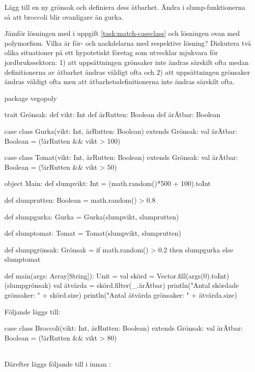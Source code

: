 \Subtask Lägg till en ny grönsak  och definiera dess ätbarhet. Ändra i slump-funktionerna så att broccoli blir ovanligare än gurka.

\Subtask Jämför lösningen med  i uppgift \ref{task:match-caseclass} och lösningen ovan med polymorfism. Vilka är för- och nackdelarna med respektive lösning? Diskutera två olika situationer på ett hypotetiskt företag som utvecklar mjukvara för jordbrukssektorn: 1) att uppsättningen grönsaker inte ändras särskilt ofta medan definitionerna av ätbarhet ändras väldigt ofta och 2) att uppsättningen grönsaker ändras väldigt ofta men att ätbarhetsdefinitionerna inte ändras särskilt ofta.



\SOLUTION


\TaskSolved \what


\SubtaskSolved
\begin{Code}
package vegopoly

trait Grönsak:
	def vikt: Int
	def ärRutten: Boolean
	def ärÄtbar: Boolean

case class Gurka(vikt: Int, ärRutten: Boolean) extends Grönsak:
  val ärÄtbar: Boolean = (!ärRutten && vikt > 100)

case class Tomat(vikt: Int, ärRutten: Boolean) extends Grönsak:
  val ärÄtbar: Boolean = (!ärRutten && vikt > 50)

object Main:
	def slumpvikt: Int = (math.random()*500 + 100).toInt

	def slumprutten: Boolean = math.random() > 0.8

	def slumpgurka: Gurka = Gurka(slumpvikt, slumprutten)

	def slumptomat: Tomat = Tomat(slumpvikt, slumprutten)

	def slumpgrönsak: Grönsak =
    if math.random() > 0.2 then slumpgurka else slumptomat

	def main(args: Array[String]): Unit = 
		val skörd = Vector.fill(args(0).toInt)(slumpgrönsak)
		val ätvärda = skörd.filter(_.ärÄtbar)
		println("Antal skördade grönsaker: " + skörd.size)
		println("Antal ätvärda grönsaker: " + ätvärda.size)
\end{Code}

\SubtaskSolved
Följande  läggs till:
\begin{Code}
case class Broccoli(vikt: Int, ärRutten: Boolean) extends Grönsak:
  val ärÄtbar: Boolean = (!ärRutten && vikt > 80)
\end{Code}
~\\
Därefter läggs följande till i  innan :

